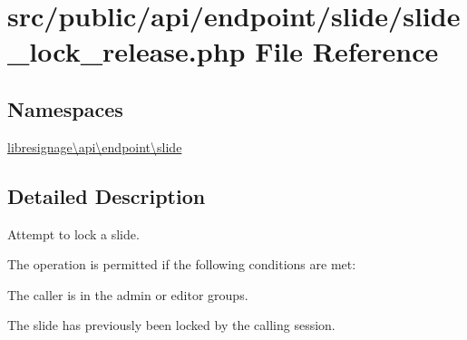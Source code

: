 \hypertarget{src_2public_2api_2endpoint_2slide_2slide__lock__release_8php}{}\section{src/public/api/endpoint/slide/slide\+\_\+lock\+\_\+release.php File Reference}
\label{src_2public_2api_2endpoint_2slide_2slide__lock__release_8php}
\subsection*{Namespaces}
\begin{DoxyCompactItemize}
\item 
 \hyperlink{namespacelibresignage_1_1api_1_1endpoint_1_1slide}{libresignage\textbackslash{}api\textbackslash{}endpoint\textbackslash{}slide}
\end{DoxyCompactItemize}


\subsection{Detailed Description}
Attempt to lock a slide.

The operation is permitted if the following conditions are met\+:


\begin{DoxyItemize}
\item The caller is in the \textquotesingle{}admin\textquotesingle{} or \textquotesingle{}editor\textquotesingle{} groups.
\item The slide has previously been locked by the calling session.
\end{DoxyItemize}

